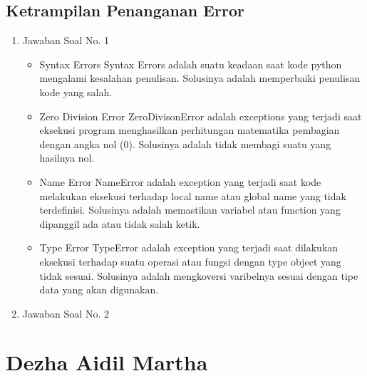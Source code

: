 \subsection{Ketrampilan Penanganan Error}
\begin{enumerate}
\item Jawaban Soal No. 1
\begin{itemize}
\item Syntax Errors
Syntax Errors adalah suatu keadaan saat kode python mengalami kesalahan penulisan. Solusinya adalah memperbaiki penulisan kode yang salah.

\item Zero Division Error
ZeroDivisonError adalah exceptions yang terjadi saat eksekusi program menghasilkan perhitungan matematika pembagian dengan angka nol (0). Solusinya adalah tidak membagi suatu yang hasilnya nol.

\item Name Error
NameError adalah exception yang terjadi saat kode melakukan eksekusi terhadap local name atau global name yang tidak terdefinisi. Solusinya adalah memastikan variabel atau function yang dipanggil ada atau tidak salah ketik.

\item Type Error
TypeError adalah exception yang terjadi saat dilakukan eksekusi terhadap suatu operasi atau fungsi dengan type object yang tidak sesuai. Solusinya adalah mengkoversi varibelnya sesuai dengan tipe data yang akan digunakan.

\end{itemize}

\item Jawaban Soal No. 2																			

\end{enumerate}
 
 \section{Dezha Aidil Martha}
